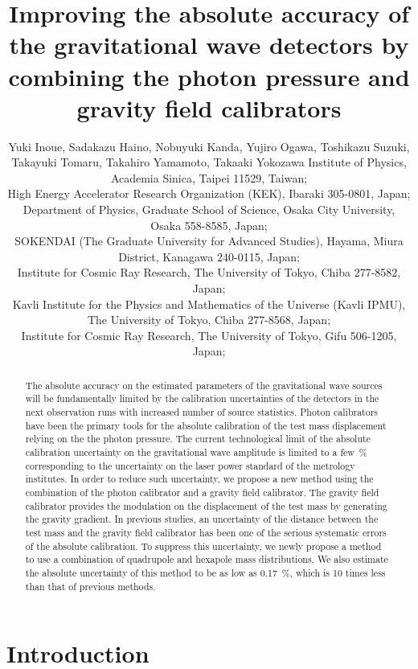 \documentclass[A4]{spie}  %
\title{Improving the absolute accuracy of the gravitational wave detectors by combining the photon pressure and gravity field calibrators}
\author{Yuki Inoue\supit{a,b}, Sadakazu Haino\supit{a,b}, Nobuyuki Kanda\supit{c}, Yujiro Ogawa\supit{b,d}, Toshikazu Suzuki\supit{b,e,f}, Takayuki Tomaru\supit{b,d,e,f}, Takahiro Yamamoto\supit{g}, Takaaki Yokozawa\supit{g}
\skiplinehalf
\supit{a}Institute of Physics, Academia Sinica, Taipei 11529, Taiwan; \\
\supit{b}High Energy Accelerator Research Organization (KEK), Ibaraki 305-0801, Japan;\\
\supit{c}Department of Physics, Graduate School of Science, Osaka City University, Osaka 558-8585, Japan;\\
\supit{d}SOKENDAI (The Graduate University for Advanced Studies), Hayama, Miura District, Kanagawa 240-0115, Japan;\\
\supit{e}Institute for Cosmic Ray Research, The University of Tokyo, Chiba 277-8582, Japan;\\
\supit{f}Kavli Institute for the Physics and Mathematics of the Universe (Kavli IPMU), The University of Tokyo, Chiba 277-8568, Japan;\\
\supit{g}Institute for Cosmic Ray Research, The University of Tokyo, Gifu 506-1205, Japan;\\
}
\begin{document}
 
\maketitle 

\begin{abstract}
The absolute accuracy on the estimated parameters of the gravitational wave sources will be fundamentally limited by the calibration uncertainties of the detectors in the next observation runs with increased number of source statistics.
Photon calibrators have been the primary tools for the absolute calibration of the test mass displacement relying on the the photon pressure. 
The current technological limit of the absolute calibration uncertainty on the gravitational wave amplitude is limited to a few~\% corresponding to the uncertainty on the laser power standard of the metrology institutes. In order to reduce such uncertainty, we propose a new method using the combination of the photon calibrator and a gravity field calibrator. The gravity field calibrator provides the modulation on the displacement of the test mass by generating the gravity gradient. In previous studies, an uncertainty of the distance between the test mass and the gravity field calibrator has been one of the serious systematic errors of the absolute calibration. To suppress this uncertainty, we newly propose a method to use a combination of quadrupole and hexapole mass distributions. We also estimate the absolute uncertainty of this method to be as low as 0.17~\%, which is 10 times less than that of previous methods.
\end{abstract}



\section{Introduction}
\end{document}
